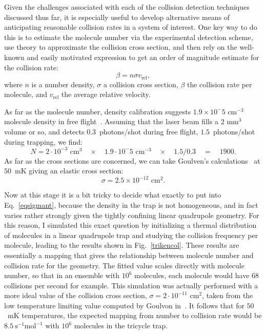 Given the challenges associated with each of the collision detection techniques discussed thus far, it is especially useful to develop alternative means of anticipating reasonable collision rates in a system of interest.
One key way to do this is to estimate the molecule number via the experimental detection scheme, use theory to approximate the collision cross section, and then rely on the well-known and easily motivated expression to get an order of magnitude estimate for the collision rate:
\begin{equation}
\beta = n\sigma v_\text{rel},\label{eqsigmant}
\end{equation}
where $n$ is a number density, $\sigma$ a collision cross section, $\beta$ the collision rate per molecule, and $v_\text{rel}$ the average relative velocity.

As far as the molecule number, density calibration suggests $1.9\times10^-5\text{ cm}^{-3}$ molecule density in free flight~\citep[Sec.~4.6]{WuThesis2019}. Assuming that the laser beam fills a $2\text{ mm}^3$ volume or so, and detects $0.3$~photons/shot during free flight, $1.5$~photons/shot during trapping, we find:
\begin{equation}
N = 2\cdot10^{-3}\text{ cm}^3\quad\times\quad 1.9\cdot10^-5\text{ cm}^{-3}\quad\times\quad 1.5/0.3 \quad=\quad 1900.
\end{equation}
As far as the cross sections are concerned, we can take Goulven's calculations~\citep[Inset of Fig.~1b]{Stuhl2012evap} at $50$~mK giving an elastic cross section: 
\begin{equation}
\sigma = 2.5\times10^{-12}\text{ cm}^2.
\end{equation}

Now at this stage it is a bit tricky to decide what exactly to put into Eq.~\ref{eqsigmant}, because the density in the trap is not homogeneous, and in fact varies rather strongly given the tightly confining linear quadrupole geometry.
For this reason, I simulated this exact question by initializing a thermal distribution of molecules in a linear quadrupole trap and studying the collision frequency per molecule, leading to the results shown in Fig.~\ref{trikencol}.
These results are essentially a mapping that gives the relationship between molecule number and collision rate for the geometry.
The fitted value scales directly with molecule number, so that in an ensemble with $10^6$ molecules, each molecule would have $68$ collisions per second for example.
This simulation was actually performed with a more ideal value of the collision cross section, $\sigma = 2\cdot10^{-11}\text{ cm}^2$, taken from the low temperature limiting value computed by Goulvon in~\citep[Fig.~1b]{Stuhl2012evap}.
It follows that for $50$~mK temperatures, the expected mapping from number to collision rate would be $8.5~\text{s}^{-1}\text{mol}^{-1}$ with $10^6$ molecules in the tricycle trap.

